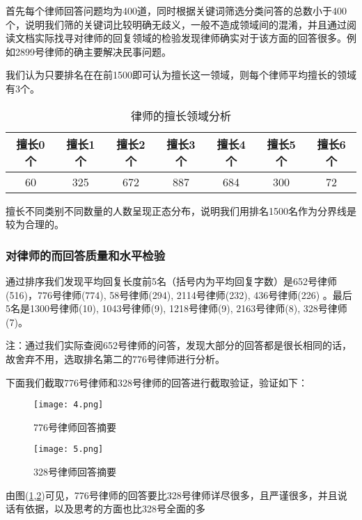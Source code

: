 \documentclass[bwprint]{cumcmthesis}
\begin{document}
首先每个律师回答问题均为400道，同时根据关键词筛选分类问答的总数小于400个，说明我们筛的关键词比较明确无歧义，一般不造成领域间的混淆，并且通过阅读文档实际找寻对律师的回复领域的检验发现律师确实对于该方面的回答很多。例如2899号律师的确主要解决民事问题。

我们认为只要排名在在前1500即可认为擅长这一领域，则每个律师平均擅长的领域有3个。

\begin{table}[!htp]
\center
\caption{律师的擅长领域分析}
\label{律师的擅长领域分析}
    \begin{tabular}{|c|c|c|c|c|c|c|}
    \hline
    擅长0个   & 擅长1个 & 擅长2个 & 擅长3个 & 擅长4个 & 擅长5个 & 擅长6个 \\ \hline
    60 & 325    & 672   & 887    & 684    & 300    & 72    \\ \hline

    \end{tabular}
\end{table}

擅长不同类别不同数量的人数呈现正态分布，说明我们用排名1500名作为分界线是较为合理的。

\subsubsection*{对律师的而回答质量和水平检验}

通过排序我们发现平均回复长度前5名（括号内为平均回复字数）是652号律师(516)，776号律师(774), 58号律师(294), 2114号律师(232), 436号律师(226) 。最后5名是1300号律师(10), 1043号律师(9), 1218号律师(9), 2163号律师(8), 328号律师(7)。

注：通过我们实际查阅652号律师的问答，发现大部分的回答都是很长相同的话，故舍弃不用，选取排名第二的776号律师进行分析。

下面我们截取776号律师和328号律师的回答进行截取验证，验证如下：


\begin{figure}[!htp]
\centering
\texttt{[image: 4.png]}
\caption{776号律师回答摘要}
\label{776号律师回答摘要}
\end{figure}


\begin{figure}[!htp]
\centering
\texttt{[image: 5.png]}
\caption{328号律师回答摘要}
\label{328号律师回答摘要}
\end{figure}

由图(\ref{776号律师回答摘要},\ref{328号律师回答摘要})可见，776号律师的回答要比328号律师详尽很多，且严谨很多，并且说话有依据，以及思考的方面也比328号全面的多
\end{document}

